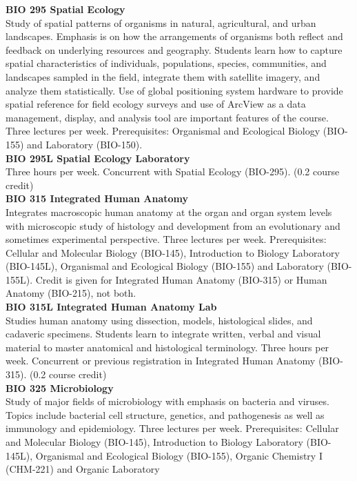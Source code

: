 \documentclass[
  letterpaper,
]{scrbook}
\begin{document}
\textbf{BIO 295 Spatial Ecology}\\
Study of spatial patterns of organisms in natural, agricultural, and
urban landscapes. Emphasis is on how the arrangements of organisms both
reflect and feedback on underlying resources and geography. Students
learn how to capture spatial characteristics of individuals,
populations, species, communities, and landscapes sampled in the field,
integrate them with satellite imagery, and analyze them statistically.
Use of global positioning system hardware to provide spatial reference
for field ecology surveys and use of ArcView as a data management,
display, and analysis tool are important features of the course. Three
lectures per week. Prerequisites: Organismal and Ecological Biology
(BIO-155) and Laboratory (BIO-150).\\
\textbf{BIO 295L Spatial Ecology Laboratory}\\
Three hours per week. Concurrent with Spatial Ecology (BIO-295). (0.2
course credit)\\
\textbf{BIO 315 Integrated Human Anatomy}\\
Integrates macroscopic human anatomy at the organ and organ system
levels with microscopic study of histology and development from an
evolutionary and sometimes experimental perspective. Three lectures per
week. Prerequisites: Cellular and Molecular Biology (BIO-145),
Introduction to Biology Laboratory (BIO-145L), Organismal and Ecological
Biology (BIO-155) and Laboratory (BIO-155L). Credit is given for
Integrated Human Anatomy (BIO-315) or Human Anatomy (BIO-215), not
both.\\
\textbf{BIO 315L Integrated Human Anatomy Lab}\\
Studies human anatomy using dissection, models, histological slides, and
cadaveric specimens. Students learn to integrate written, verbal and
visual material to master anatomical and histological terminology. Three
hours per week. Concurrent or previous registration in Integrated Human
Anatomy (BIO-315). (0.2 course credit)\\
\textbf{BIO 325 Microbiology}\\
Study of major fields of microbiology with emphasis on bacteria and
viruses. Topics include bacterial cell structure, genetics, and
pathogenesis as well as immunology and epidemiology. Three lectures per
week. Prerequisites: Cellular and Molecular Biology (BIO-145),
Introduction to Biology Laboratory (BIO-145L), Organismal and Ecological
Biology (BIO-155), Organic Chemistry I (CHM-221) and Organic Laboratory
\end{document}
